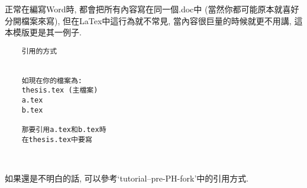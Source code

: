
正常在編寫Word時, 都會把所有內容寫在同一個.doc中 (當然你都可能原本就喜好分開檔案來寫), 但在LaTex中這行為就不常見, 當內容很巨量的時候就更不用講, 這本模版更是其一例子.\\

  \begin{DescriptionFrame}
  \begin{verbatim}
    引用的方式
    

    如現在你的檔案為:
    thesis.tex (主檔案)
    a.tex
    b.tex

    那要引用a.tex和b.tex時
    在thesis.tex中要寫
    
    
  \end{verbatim}
  \end{DescriptionFrame}

如果還是不明白的話, 可以參考`tutorial--pre-PH-fork'中的引用方式.

